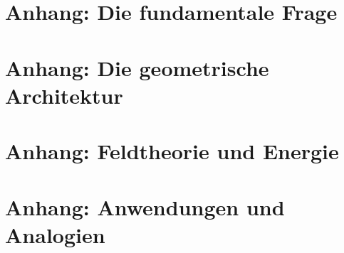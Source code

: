 \documentclass[11pt,oneside]{book}
\begin{document}






\appendix

\part{Anhang: Die fundamentale Frage}


\part{Anhang: Die geometrische Architektur}





\part{Anhang: Feldtheorie und Energie}



\part{Anhang: Anwendungen und Analogien}



\end{document}
